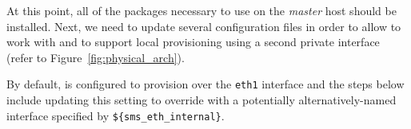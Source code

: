 At this point, all of the packages necessary to use \Warewulf{} on the {\em
master} host should be installed. Next, we need to update several
configuration files in order to allow \Warewulf{} to work with \baseOS{} and to
support local provisioning using a second private interface (refer to
Figure~\ref{fig:physical_arch}).
\begin{center}
\begin{tcolorbox}[]
\small
By default, \Warewulf{} is configured to
provision over the \texttt{eth1} interface and the steps below include updating
this setting to override with a potentially alternatively-named interface specified by
\texttt{\$\{sms\_eth\_internal\}}.
\end{tcolorbox}
\end{center}

